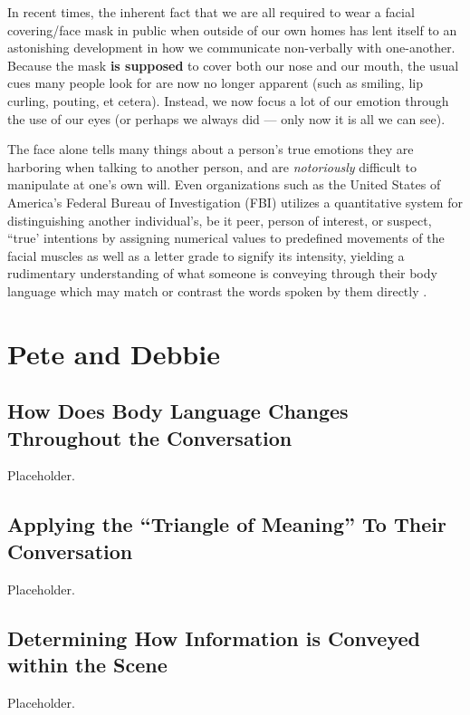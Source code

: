 \documentclass[stu,12pt]{apa7}
\begin{document}
      In recent times, the inherent fact that we are all required to wear a
        facial covering/face mask in public when outside of our own homes has
        lent itself to an astonishing development in how we communicate
        non-verbally with one-another. Because the mask \textbf{is supposed}
        to cover both our nose and our mouth, the usual cues many people look
        for are now no longer apparent (such as smiling, lip curling, pouting,
        et cetera). Instead, we now focus a lot of our emotion through the use
        of our eyes (or perhaps we always did --- only now it is all we can
        see).

      The face alone tells many things about a person's true emotions they are
        harboring when talking to another person, and are \textit{notoriously}
        difficult to manipulate at one's own will. Even organizations such as
        the United States of America's Federal Bureau of Investigation (FBI)
        utilizes a quantitative system for distinguishing another individual's,
        be it peer, person of interest, or suspect, ``true' intentions by
        assigning numerical values to predefined movements of the facial muscles
        as well as a letter grade to signify its intensity, yielding a
        rudimentary understanding of what someone is conveying through their
        body language which may match or contrast the words spoken by them
        directly \parencite[pp. 209]{cohn_observer-based_2007}.


  \section{Pete and Debbie}
    \subsection{How Does Body Language Changes Throughout the Conversation}
      Placeholder.

    \subsection{Applying the ``Triangle of Meaning'' To Their Conversation}
      Placeholder.

    \subsection{Determining How Information is Conveyed within the Scene}
      Placeholder.


  \newpage
  \printbibliography[%
    title={References},%
    heading={bibintoc},%
    notcategory={consulted}%
  ]


  \newpage
  \nocite{*}
  \printbibliography[%
    title={Additional References},%
    heading={bibintoc},%
    category={consulted}%
  ]
\end{document}
